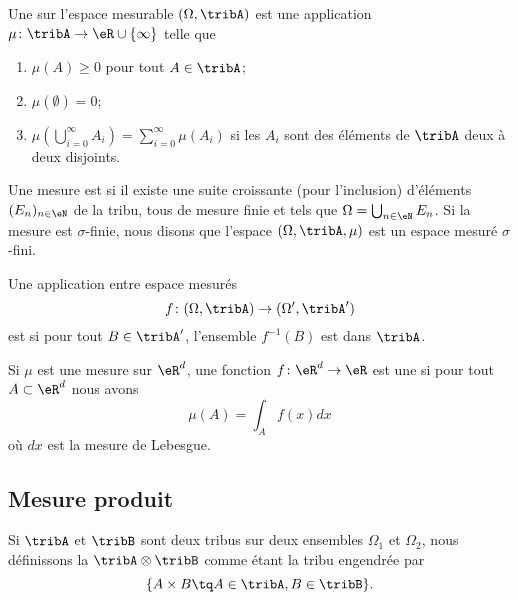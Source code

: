\begin{definition}
    Une  sur l'espace mesurable \( (\Omega,\tribA)\) est une application \( \mu\colon \tribA\to \eR\cup\{ \infty \}\) telle que
    \begin{enumerate}
        \item
            \( \mu(A)\geq 0\) pour tout \( A\in\tribA\);
        \item
            \( \mu(\emptyset)=0\);
        \item
            \( \mu\left( \bigcup_{i=0}^{\infty}A_i\right)=\sum_{i=0}^{\infty}\mu(A_i)\) si les \( A_i\) sont des éléments de \( \tribA\) deux à deux disjoints.
    \end{enumerate}
    Une mesure est  si il existe une suite croissante (pour l'inclusion) d'éléments \( (E_n)_{n\in\eN}\) de la tribu, tous de mesure finie et tels que \( \Omega=\bigcup_{n\in \eN}E_n\). Si la mesure est $\sigma$-finie, nous disons que l'espace \( (\Omega,\tribA,\mu)\) est un espace mesuré $\sigma$-fini.
\end{definition}

\begin{definition}
    Une application entre espace mesurés
    \begin{equation}
        f\colon (\Omega,\tribA)\to (\Omega',\tribA')
    \end{equation}
    est  si pour tout \( B\in\tribA'\), l'ensemble \( f^{-1}(B)\) est dans \( \tribA\).
\end{definition}

Si \( \mu\) est une mesure sur \( \eR^d\), une fonction \( f\colon \eR^d\to \eR\) est une  si pour tout \( A\subset\eR^d\) nous avons
\begin{equation}
    \mu(A)=\int_Af(x)dx
\end{equation}
où \( dx\) est la mesure de Lebesgue.

\subsection{Mesure produit}

\begin{definition}      \label{DefTribProfGfYTuR}
    Si \( \tribA\) et \( \tribB\) sont deux tribus sur deux ensembles \( \Omega_1\) et \( \Omega_2\), nous définissons la  \( \tribA\otimes\tribB\) comme étant la tribu engendrée par 
    \begin{equation}
        \{ A\times B\tq A\in\tribA,B\in\tribB \}.
    \end{equation}
\end{definition}

